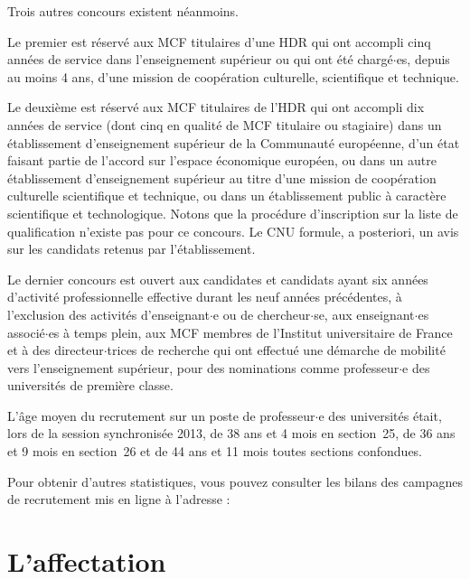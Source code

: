 Trois autres concours existent n\'eanmoins.

Le premier est r\'eserv\'e
aux MCF titulaires d'une HDR qui ont accompli cinq ann\'ees de service dans l'enseignement sup\'erieur ou qui ont \'et\'e charg\'e$\cdot$es, 
depuis au moins 4 ans, d'une mission de coop\'eration culturelle,
scientifique et technique.

Le deuxi\`eme est r\'eserv\'e aux MCF titulaires de l'HDR qui ont accompli dix ann\'ees de service
(dont cinq en qualit\'e de MCF titulaire ou stagiaire) dans un \'etablissement d'enseignement sup\'erieur
de la Communaut\'e europ\'eenne, d'un \'etat faisant partie de l'accord sur l'espace \'economique
europ\'een,
ou dans un autre \'etablissement d'enseignement sup\'erieur au titre d'une mission de coop\'eration culturelle scientifique et technique, 
ou dans un \'etablissement public \`a caract\`ere scientifique et technologique.
Notons que la proc\'edure d'inscription sur la liste de qualification n'existe pas pour ce concours.
Le CNU formule, a posteriori, un avis sur les candidats retenus par l'\'etablissement.

Le dernier concours est ouvert
aux candidates et candidats ayant six ann\'ees d'activit\'e professionnelle effective
durant les neuf ann\'ees pr\'ec\'edentes,
\`a l'exclusion des activit\'es d'enseignant$\cdot$e ou de chercheur$\cdot$se,
aux enseignant$\cdot$es associ\'e$\cdot$es \`a temps plein,
aux MCF membres de l'Institut universitaire de France
et \`a des directeur$\cdot$trices de recherche qui ont effectu\'e une d\'emarche de mobilit\'e
vers l'enseignement sup\'erieur, pour des nominations comme professeur$\cdot$e des universit\'es de premi\`ere classe.

L'\^age moyen du recrutement sur un poste de professeur$\cdot$e des
universit\'es \'etait, lors de la session synchronis\'ee 2013, 
de 38 ans et 4 mois en section~25, 
de 36 ans et 9 mois en section~26 et 
de 44 ans et 11 mois toutes sections confondues.

Pour obtenir d'autres statistiques, vous pouvez consulter les
bilans des campagnes de recrutement mis en ligne \`a l'adresse :
{}








\section{L'affectation}

